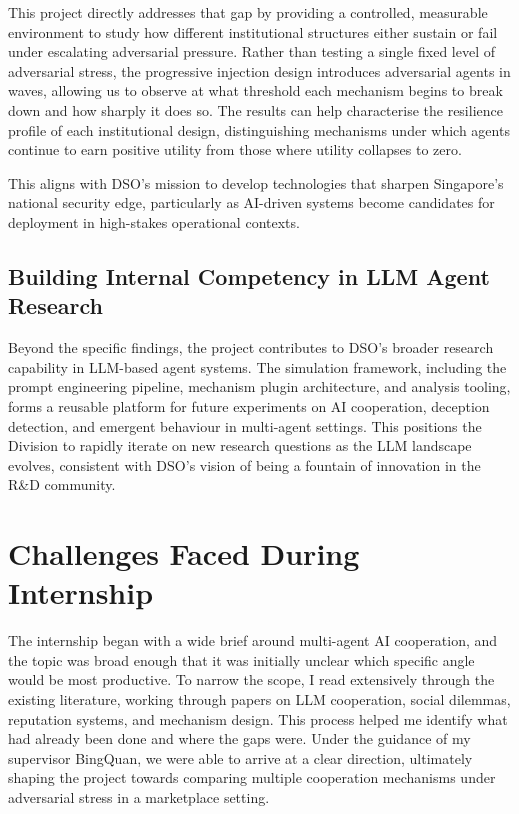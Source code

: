 \documentclass[12pt,a4paper]{article}
\begin{document}
This project directly addresses that gap by providing a controlled, measurable environment to study how different institutional structures either sustain or fail under escalating adversarial pressure. Rather than testing a single fixed level of adversarial stress, the progressive injection design introduces adversarial agents in waves, allowing us to observe at what threshold each mechanism begins to break down and how sharply it does so. The results can help characterise the resilience profile of each institutional design, distinguishing mechanisms under which agents continue to earn positive utility from those where utility collapses to zero.

This aligns with DSO's mission to develop technologies that sharpen Singapore's national security edge, particularly as AI-driven systems become candidates for deployment in high-stakes operational contexts.

\subsection*{Building Internal Competency in LLM Agent Research}

Beyond the specific findings, the project contributes to DSO's broader research capability in LLM-based agent systems. The simulation framework, including the prompt engineering pipeline, mechanism plugin architecture, and analysis tooling, forms a reusable platform for future experiments on AI cooperation, deception detection, and emergent behaviour in multi-agent settings. This positions the Division to rapidly iterate on new research questions as the LLM landscape evolves, consistent with DSO's vision of being a fountain of innovation in the R\&D community.



\section{Challenges Faced During Internship}

The internship began with a wide brief around multi-agent AI cooperation, and the topic was broad enough that it was initially unclear which specific angle would be most productive. To narrow the scope, I read extensively through the existing literature, working through papers on LLM cooperation, social dilemmas, reputation systems, and mechanism design. This process helped me identify what had already been done and where the gaps were. Under the guidance of my supervisor BingQuan, we were able to arrive at a clear direction, ultimately shaping the project towards comparing multiple cooperation mechanisms under adversarial stress in a marketplace setting.
\end{document}
